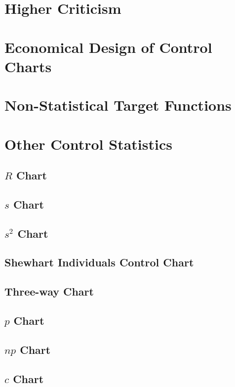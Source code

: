 \section{Higher Criticism}




\section{Economical Design of Control Charts}
\label{sec:economical_considerations}






\section{Non-Statistical Target Functions}






\section{Other Control Statistics}
\label{sec:other_control_charts}
\subsection{$R$ Chart}
\subsection{$s$ Chart}
\subsection{$s^2$ Chart}
\subsection{Shewhart Individuals Control Chart}
\subsection{Three-way Chart}
\subsection{$p$ Chart}
\subsection{$np$ Chart}
\subsection{$c$ Chart}
